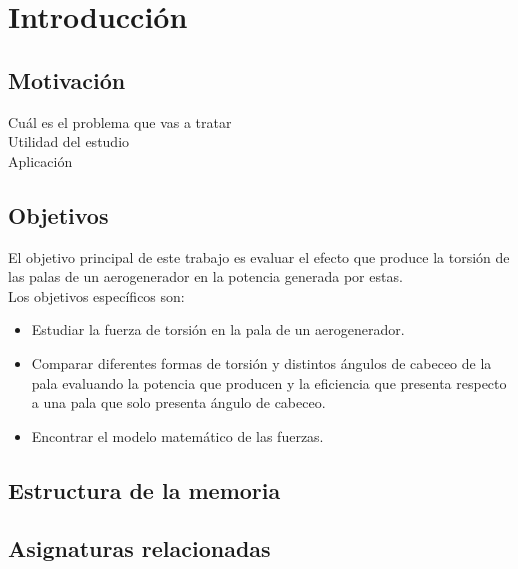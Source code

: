 \section{Introducción}

\subsection{Motivación}

Cuál es el problema que vas a tratar\\
Utilidad del estudio\\
Aplicación\\

\subsection{Objetivos}
El objetivo principal de este trabajo es evaluar el efecto que produce la torsión de las palas de un aerogenerador en la potencia generada por estas.\\

Los objetivos específicos son:
\begin{itemize}
    \item Estudiar la fuerza de torsión en la pala de un aerogenerador.
    \item Comparar diferentes formas de torsión y distintos ángulos de cabeceo de la pala evaluando la potencia que producen y la eficiencia que presenta respecto a una pala que solo presenta ángulo de cabeceo.
    \item Encontrar el modelo matemático de las fuerzas.
\end{itemize}

\subsection{Estructura de la memoria}

\subsection{Asignaturas relacionadas}